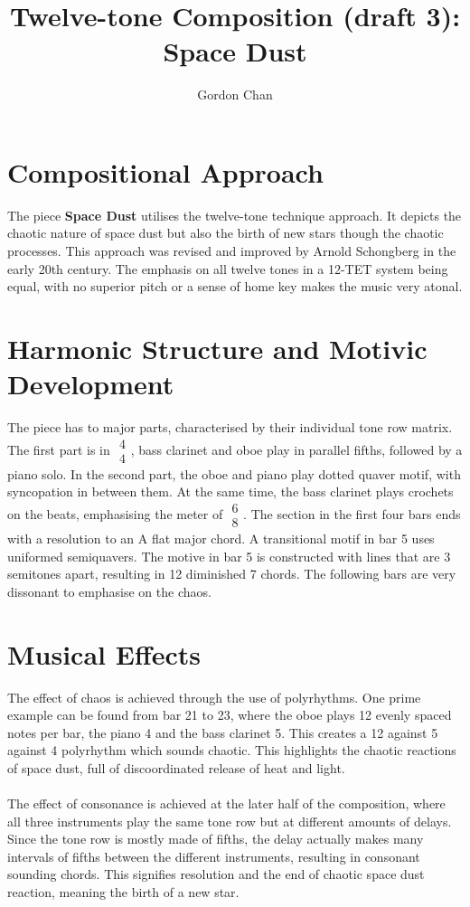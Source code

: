 \documentclass[a4paper]{article}
\title{Twelve-tone Composition (draft 3): \textbf{Space Dust}}
\author{Gordon Chan}
\begin{document}
\maketitle
\section{Compositional Approach}

The piece \textbf{Space Dust} utilises the twelve-tone technique approach. It
depicts the chaotic nature of space dust but also the birth of new stars though
the chaotic processes. This approach was revised and improved by Arnold
Schongberg in the early 20th century. The emphasis on all twelve tones in a
12-TET system being equal, with no superior pitch or a sense of home key makes
the music very atonal.

\section{Harmonic Structure and Motivic Development}

The piece has to major parts, characterised by their individual tone row
matrix. The first part is in \(\begin{array}{c}4\\4\end{array}\), bass clarinet and oboe play in parallel fifths,
followed by a piano solo. In the second part, the oboe and piano play dotted
quaver motif, with syncopation in between them. At the same time, the bass
clarinet plays crochets on the beats, emphasising the meter of
\(\begin{array}{c}6\\8\end{array}\).  The section in the first four bars ends
	with a resolution to an A flat major chord. A transitional motif in bar
	5 uses uniformed semiquavers. The motive in bar 5 is constructed with
	lines that are 3 semitones apart, resulting in 12 diminished 7 chords.
	The following bars are very dissonant to emphasise on the chaos.

\section{Musical Effects}

The effect of chaos is achieved through the use of polyrhythms. One prime example can be found from bar 21 to 23, where the oboe plays 12 evenly spaced notes per bar, the piano 4 and the bass clarinet 5. This creates a 12 against 5 against 4 polyrhythm which sounds chaotic. This highlights the chaotic reactions of space dust, full of discoordinated release of heat and light.
\\
\\
The effect of consonance is achieved at the later half of the composition, where all three instruments play the same tone row but at different amounts of delays. Since the tone row is mostly made of fifths, the delay actually makes many intervals of fifths between the different instruments, resulting in consonant sounding chords. This signifies resolution and the end of chaotic space dust reaction, meaning the birth of a new star.
\end{document}
